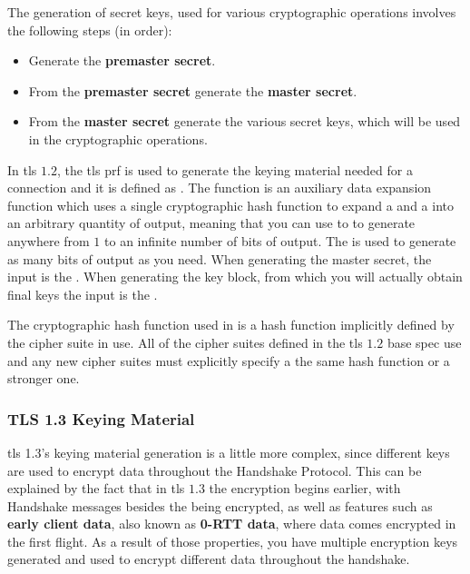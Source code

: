 \documentclass{llncs}
\begin{document}
The generation of secret keys, used for various cryptographic operations involves the
following steps (in order):

\begin{itemize}
  \item Generate the \textbf{premaster secret}.
  \item From the \textbf{premaster secret} generate the \textbf{master secret}.
  \item From the \textbf{master secret} generate the various secret keys, which
  will be used in the cryptographic operations.
\end{itemize}

In \gls{tls} $1.2$, the \gls{tls} \gls{prf} is used to generate the keying material
needed for a connection and it is defined as .
The  function is an auxiliary data expansion function
which uses a single cryptographic hash function to expand a  and a 
into an arbitrary quantity of output, meaning that you can use to to generate
anywhere from $1$ to an infinite number of bits of output. The 
is used to generate as many bits of output as you need. When generating the
master secret, the  input is the .
When generating the key block, from which you will actually obtain final keys
the  input is the .

The cryptographic hash function used in  is
a hash function implicitly defined by the cipher suite in use. All of the cipher
suites defined in the \gls{tls} $1.2$ base spec use  and any new
cipher suites must explicitly specify a the same hash function or a stronger one.

\subsubsection{TLS 1.3 Keying Material}

\gls{tls} 1.3's keying material generation is a little more complex, since different
keys are used to encrypt data throughout the Handshake Protocol. This can be
explained by the fact that in \gls{tls} $1.3$ the encryption begins earlier, with
Handshake messages besides the  being encrypted,
as well as features such as \textbf{early client data}, also known as \textbf{0-RTT data},
where data comes encrypted in the first flight. As a result of those properties,
you have multiple encryption keys generated and used to encrypt different data
throughout the handshake.
\end{document}
